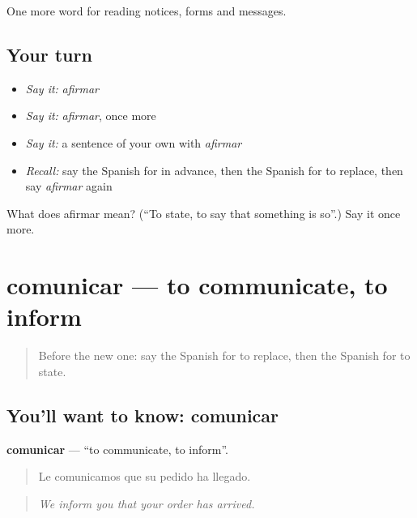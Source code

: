 \begin{grammarlens}[title={What you've built}]
One more word for reading notices, forms and messages.
\end{grammarlens}

\subsection*{Your turn}
\begin{itemize}
\raggedright
  \item \emph{Say it:} \emph{afirmar}
  \item \emph{Say it:} \emph{afirmar}, once more
  \item \emph{Say it:} a sentence of your own with \emph{afirmar}
  \item \emph{Recall:} say the Spanish for in advance, then the Spanish for to replace, then say \emph{afirmar} again
\end{itemize}

\begin{tcolorbox}[breakable,colback=teal!4,colframe=teal!35!black,title={Before you move on}]
What does afirmar mean? (\textquotedblleft{}To state, to say that something is so\textquotedblright{}.) Say it once more.
\end{tcolorbox}
\section[comunicar]{comunicar — to communicate, to inform}

\label{lesson:ES-C480-comunicar}



\begin{quote}
Before the new one: say the Spanish for to replace, then the Spanish for to state.
\end{quote}

\subsection*{You'll want to know: comunicar}
\textbf{comunicar} — \textquotedblleft{}to communicate, to inform\textquotedblright{}.

\begin{quote}
Le comunicamos que su pedido ha llegado.
\end{quote}

\begin{quote}
\emph{We inform you that your order has arrived.}
\end{quote}


